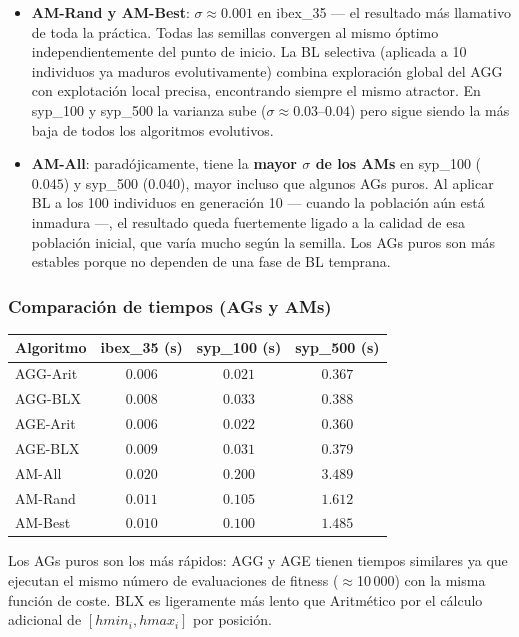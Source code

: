 \documentclass[12pt,a4paper]{article}
\begin{document}
\begin{itemize}
  \item \textbf{AM-Rand y AM-Best}: $\sigma \approx 0.001$ en ibex\_35 — el resultado
  más llamativo de toda la práctica. Todas las semillas convergen al mismo óptimo
  independientemente del punto de inicio. La BL selectiva (aplicada a 10 individuos
  ya maduros evolutivamente) combina exploración global del AGG con explotación local
  precisa, encontrando siempre el mismo atractor. En syp\_100 y syp\_500 la varianza
  sube ($\sigma \approx 0.03$--$0.04$) pero sigue siendo la más baja de todos los
  algoritmos evolutivos.

  \item \textbf{AM-All}: paradójicamente, tiene la \textbf{mayor $\sigma$ de los AMs}
  en syp\_100 ($0.045$) y syp\_500 ($0.040$), mayor incluso que algunos AGs puros. Al
  aplicar BL a los 100 individuos en generación 10 — cuando la población aún está
  inmadura —, el resultado queda fuertemente ligado a la calidad de esa población inicial,
  que varía mucho según la semilla. Los AGs puros son más estables porque no dependen de
  una fase de BL temprana.
\end{itemize}

\subsubsection*{Comparación de tiempos (AGs y AMs)}

\begin{center}\footnotesize
\begin{tabular}{lccc}
\toprule
\textbf{Algoritmo} & \textbf{ibex\_35 (s)} & \textbf{syp\_100 (s)} & \textbf{syp\_500 (s)} \\
\midrule
AGG-Arit & $0.006$ & $0.021$ & $0.367$ \\
AGG-BLX  & $0.008$ & $0.033$ & $0.388$ \\
AGE-Arit & $0.006$ & $0.022$ & $0.360$ \\
AGE-BLX  & $0.009$ & $0.031$ & $0.379$ \\
AM-All   & $0.020$ & $0.200$ & $3.489$ \\
AM-Rand  & $0.011$ & $0.105$ & $1.612$ \\
AM-Best  & $0.010$ & $0.100$ & $1.485$ \\
\bottomrule
\end{tabular}
\end{center}

Los AGs puros son los más rápidos: AGG y AGE tienen tiempos similares ya que ejecutan
el mismo número de evaluaciones de fitness ($\approx$10\,000) con la misma función de
coste. BLX es ligeramente más lento que Aritmético por el cálculo adicional de
$[hmin_i, hmax_i]$ por posición.
\end{document}
